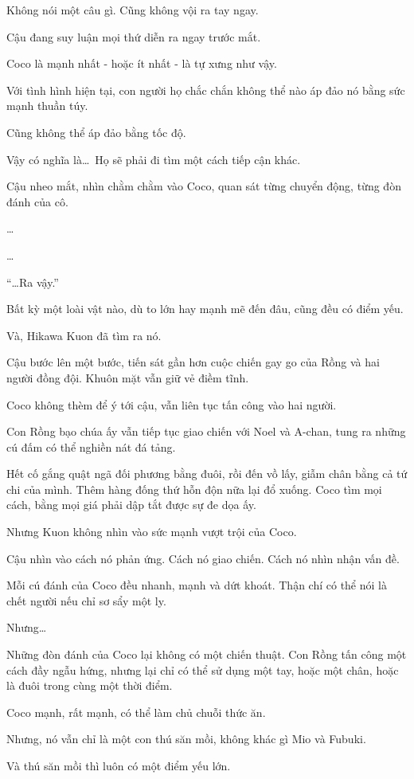 \documentclass[../main.tex]{subfiles}
\begin{document}
Không nói một câu gì. Cũng không vội ra tay ngay.

Cậu đang suy luận mọi thứ diễn ra ngay trước mắt.

Coco là mạnh nhất - hoặc ít nhất - là tự xưng như vậy.

Với tình hình hiện tại, con người họ chắc chắn không thể nào áp đảo nó bằng sức mạnh thuần túy.

Cũng không thể áp đảo bằng tốc độ.

Vậy có nghĩa là\dots\ Họ sẽ phải đi tìm một cách tiếp cận khác.

Cậu nheo mắt, nhìn chằm chằm vào Coco, quan sát từng chuyển động, từng đòn đánh của cô.

\dots

\dots

``\dots Ra vậy.''

Bất kỳ một loài vật nào, dù to lớn hay mạnh mẽ đến đâu, cũng đều có điểm yếu.

Và, Hikawa Kuon đã tìm ra nó.

Cậu bước lên một bước, tiến sát gần hơn cuộc chiến gay go của Rồng và hai người đồng đội. Khuôn mặt vẫn giữ vẻ điềm tĩnh.

Coco không thèm để ý tới cậu, vẫn liên tục tấn công vào hai người.

Con Rồng bạo chúa ấy vẫn tiếp tục giao chiến với Noel và A-chan, tung ra những cú đấm có thể nghiền nát đá tảng.

Hết cố gắng quật ngã đối phương bằng đuôi, rồi đến vồ lấy, giẫm chân bằng cả tứ chi của mình. Thêm hàng đống thứ hỗn độn nữa lại đổ xuống. Coco tìm mọi cách, bằng mọi giá phải dập tắt được sự đe dọa ấy.

Nhưng Kuon không nhìn vào sức mạnh vượt trội của Coco.

Cậu nhìn vào cách nó phản ứng. Cách nó giao chiến. Cách nó nhìn nhận vấn đề.

Mỗi cú đánh của Coco đều nhanh, mạnh và dứt khoát. Thận chí có thể nói là chết người nếu chỉ sơ sẩy một ly.

Nhưng\dots

Những đòn đánh của Coco lại không có một chiến thuật. Con Rồng tấn công một cách đầy ngẫu hứng, nhưng lại chỉ có thể sử dụng một tay, hoặc một chân, hoặc là đuôi trong cùng một thời điểm.

Coco mạnh, rất mạnh, có thể làm chủ chuỗi thức ăn.

Nhưng, nó vẫn chỉ là một con thú săn mồi, không khác gì Mio và Fubuki.

Và thú săn mồi thì luôn có một điểm yếu lớn.
\end{document}
